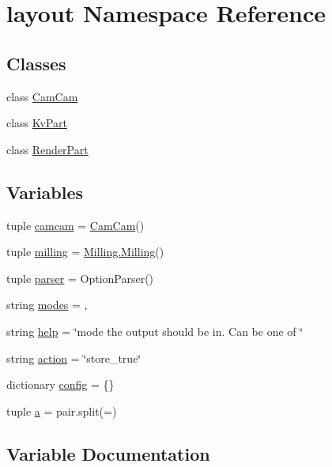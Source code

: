 \hypertarget{namespacelayout}{}\section{layout Namespace Reference}
\label{namespacelayout}
\subsection*{Classes}
\begin{DoxyCompactItemize}
\item 
class \hyperlink{classlayout_1_1_cam_cam}{Cam\+Cam}
\item 
class \hyperlink{classlayout_1_1_kv_part}{Kv\+Part}
\item 
class \hyperlink{classlayout_1_1_render_part}{Render\+Part}
\end{DoxyCompactItemize}
\subsection*{Variables}
\begin{DoxyCompactItemize}
\item 
tuple \hyperlink{namespacelayout_a4efd63b3001435f3c27da5cdd394c4cc}{camcam} = \hyperlink{classlayout_1_1_cam_cam}{Cam\+Cam}()
\item 
tuple \hyperlink{namespacelayout_a917f5d5f3feb2ac6efb7e20bdae63d72}{milling} = \hyperlink{class_milling_1_1_milling}{Milling.\+Milling}()
\item 
tuple \hyperlink{namespacelayout_a465a2855518606877a0a8671d58a1c9a}{parser} = Option\+Parser()
\item 
string \hyperlink{namespacelayout_a47fd03efd473398dfb10a65fc64eafe4}{modes} = \textquotesingle{},\textquotesingle{}
\item 
string \hyperlink{namespacelayout_aa8bcd46c44222a15f73de3e096725e5e}{help} = \char`\"{}mode the output should be in. Can be one of \char`\"{}
\item 
string \hyperlink{namespacelayout_aa92f20c6edf696c44f7073122603ad4d}{action} = \char`\"{}store\+\_\+true\char`\"{}
\item 
dictionary \hyperlink{namespacelayout_addf4c4f1e95013fa5057f1d16a235035}{config} = \{\}
\item 
tuple \hyperlink{namespacelayout_a748292864d9c627e94e6b6cc41304291}{a} = pair.\+split(\textquotesingle{}=\textquotesingle{})
\end{DoxyCompactItemize}


\subsection{Variable Documentation}
\hypertarget{namespacelayout_a748292864d9c627e94e6b6cc41304291}{}
